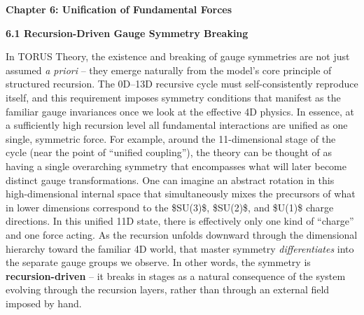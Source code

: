 \documentclass[]{article}
\date{}
\begin{document}
\textbf{Chapter 6: Unification of Fundamental Forces}

\textbf{6.1 Recursion-Driven Gauge Symmetry Breaking}

In TORUS Theory, the existence and breaking of gauge symmetries are not
just assumed \emph{a priori} -- they emerge naturally from the model's
core principle of structured recursion​. The 0D--13D recursive cycle
must self-consistently reproduce itself, and this requirement imposes
symmetry conditions that manifest as the familiar gauge invariances once
we look at the effective 4D physics​. In essence, at a sufficiently high
recursion level all fundamental interactions are unified as one single,
symmetric force. For example, around the 11-dimensional stage of the
cycle (near the point of ``unified coupling''), the theory can be
thought of as having a single overarching symmetry that encompasses what
will later become distinct gauge transformations​. One can imagine an
abstract rotation in this high-dimensional internal space that
simultaneously mixes the precursors of what in lower dimensions
correspond to the \$SU(3)\$, \$SU(2)\$, and \$U(1)\$ charge directions​.
In this unified 11D state, there is effectively only one kind of
``charge'' and one force acting. As the recursion unfolds downward
through the dimensional hierarchy toward the familiar 4D world, that
master symmetry \emph{differentiates} into the separate gauge groups we
observe​. In other words, the symmetry is \textbf{recursion-driven} --
it breaks in stages as a natural consequence of the system evolving
through the recursion layers, rather than through an external field
imposed by hand.
\end{document}
